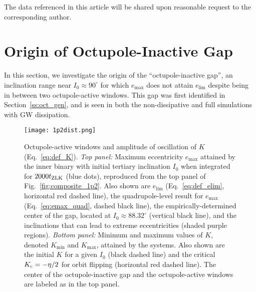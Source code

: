 \documentclass[
        fleqn,
        usenatbib,
    ]{mnras}
\begin{document}
The data referenced in this article will be shared upon reasonable request to
the corresponding author.




\clearpage
\onecolumn

\appendix

\section{Origin of Octupole-Inactive Gap}\label{app:gap}

In this section, we investigate the origin of the ``octupole-inactive gap'', an
inclination range near $I_0 \approx 90^\circ$ for which $e_{\max}$ does not
attain $e_{\lim}$ despite being in between two octupole-active windows. This gap
was first identified in Section~\ref{ss:oct_gen}, and is seen in both the
non-dissipative and full simulations with GW dissipation.

\begin{figure}
    \centering
    \texttt{[image: 1p2dist.png]}
    \caption{Octupole-active windows and amplitude of oscillation of $K$
    (Eq.~\ref{eq:def_K}). \emph{Top panel:} Maximum eccentricity $e_{\max}$
    attained by the inner binary with initial tertiary inclination $I_0$ when
    integrated for $2000 t_{\rm ZLK}$ (blue dots), reproduced from the top panel
    of Fig.~\ref{fig:composite_1p2}. Also shown are $e_{\lim}$
    (Eq.~\ref{eq:def_elim}, horizontal red dashed line), the quadrupole-level
    result for $e_{\max}$ (Eq.~\ref{eq:emax_quad}, dashed black line), the
    empirically-determined center of the gap, located at $I_0 \approx
    88.32^\circ$ (vertical black line), and the inclinations that can lead to
    extreme eccentricities (shaded purple regions). \emph{Bottom panel:} Minimum and maximum
    values of $K$, denoted $K_{\min}$ and $K_{\max}$, attained by the systems.
    Also shown are the initial $K$ for a given $I_0$ (black dashed line) and the
    critical $K_{\rm c} = -\eta / 2$ for orbit flipping (horizontal red dashed
    line). The center of the octupole-inactive gap and the octupole-active
    windows are labeled as in the top panel.
    }\label{fig:kdist}
\end{figure}
\end{document}
